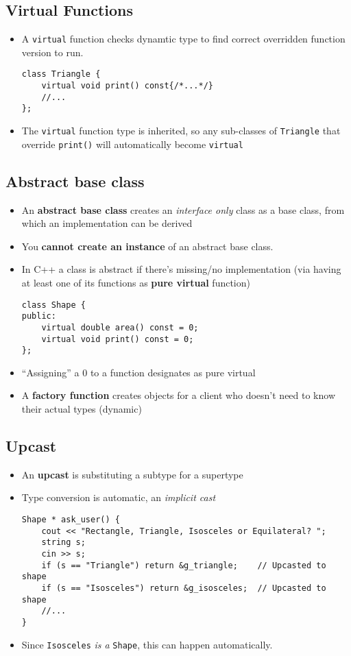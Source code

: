 \subsection{Virtual Functions}
\begin{itemize}
	\item A \lstinline[style=C++]{virtual} function checks dynamtic type to find correct overridden function version to run.
\begin{lstlisting}[style=C++]
class Triangle {
	virtual void print() const{/*...*/}
	//...
};
\end{lstlisting}
	\item The \lstinline[style=C++]{virtual} function type is inherited, so any sub-classes of \lstinline[style=C++]{Triangle} that override \lstinline[style=C++]{print()} will automatically become \lstinline[style=C++]{virtual}
\end{itemize}

\subsection{Abstract base class}
\begin{itemize}
	\item An \textbf{abstract base class} creates an \textit{interface only} class as a base class, from which an implementation can be derived
	\item You \textbf{cannot create an instance} of an abstract base class.
	\item In C++ a class is abstract if there's missing/no implementation (via having at least one of its functions as \textbf{pure virtual} function)
\begin{lstlisting}[style=C++]
class Shape {
public:
	virtual double area() const = 0;
	virtual void print() const = 0;
};
\end{lstlisting}
	\item ``Assigning'' a 0 to a function designates as pure virtual
	\item A \textbf{factory function} creates objects for a client who doesn't need to know their actual types (dynamic)
\end{itemize}

\subsection{Upcast}
\begin{itemize}
	\item An \textbf{upcast} is substituting a subtype for a supertype
	\item Type conversion is automatic, an \textit{implicit cast}
\begin{lstlisting}[style=C++]
Shape * ask_user() {
	cout << "Rectangle, Triangle, Isosceles or Equilateral? ";
	string s;
	cin >> s;
	if (s == "Triangle") return &g_triangle;	// Upcasted to shape
	if (s == "Isosceles") return &g_isosceles;	// Upcasted to shape
	//...
}
\end{lstlisting}
	\item Since \lstinline[style=C++]{Isosceles} \textit{is a} \lstinline[style=C++]{Shape}, this can happen automatically.
\end{itemize}

